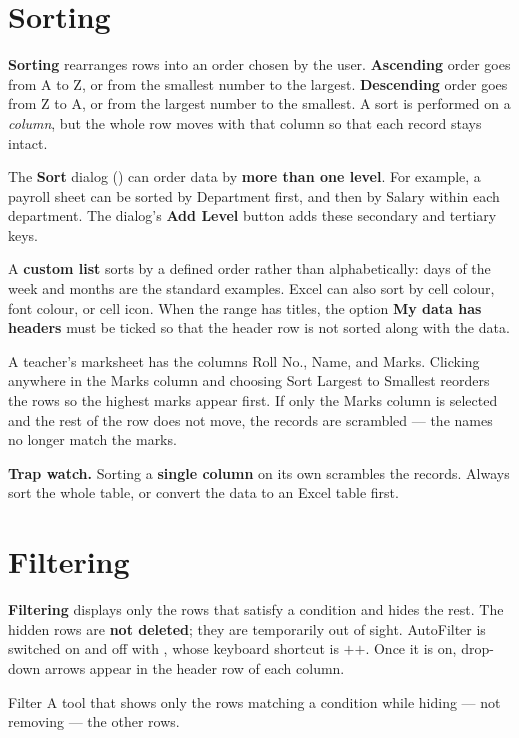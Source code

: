 \section{Sorting}
\textbf{Sorting} rearranges rows into an order chosen by the user. \textbf{Ascending}
order goes from A to Z, or from the smallest number to the largest.
\textbf{Descending} order goes from Z to A, or from the largest number to the
smallest. A sort is performed on a \emph{column}, but the whole row moves with
that column so that each record stays intact.

The \textbf{Sort} dialog () can order data by \textbf{more than
one level}. For example, a payroll sheet can be sorted by Department first, and
then by Salary within each department. The dialog's \textbf{Add Level} button
adds these secondary and tertiary keys.

A \textbf{custom list} sorts by a defined order rather than alphabetically: days
of the week and months are the standard examples. Excel can also sort by cell
colour, font colour, or cell icon. When the range has titles, the option
\textbf{My data has headers} must be ticked so that the header row is not sorted
along with the data.

\begin{example}
A teacher's marksheet has the columns Roll No., Name, and Marks. Clicking
anywhere in the Marks column and choosing Sort Largest to Smallest reorders the
rows so the highest marks appear first. If only the Marks column is selected and
the rest of the row does not move, the records are scrambled --- the names no
longer match the marks.
\end{example}

\textbf{Trap watch.} Sorting a \textbf{single column} on its own scrambles the
records. Always sort the whole table, or convert the data to an Excel table
first.

\section{Filtering}
\textbf{Filtering} displays only the rows that satisfy a condition and hides the
rest. The hidden rows are \textbf{not deleted}; they are temporarily out of
sight. AutoFilter is switched on and off with , whose
keyboard shortcut is $+$$+$. Once it is on,
drop-down arrows appear in the header row of each column.

\begin{definitionbox}{Filter}
A tool that shows only the rows matching a condition while hiding --- not
removing --- the other rows.
\end{definitionbox}

